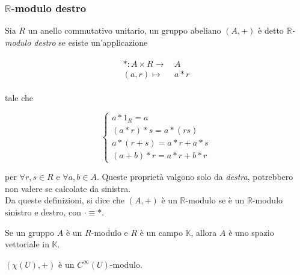 \subsubsection{$ \mathbb{R} $-modulo destro}

Sia $ R $ un anello commutativo unitario, un gruppo abeliano $ (A,+) $ è detto $ \mathbb{R} $\textit{-modulo destro} se esiste un'applicazione

\begin{align}
	\begin{split}
		* : A \times R \to& \, A\\
		(a,r) \mapsto& \, a * r
	\end{split}
\end{align}

tale che

\begin{equation}
	\begin{cases}
		a * 1_{R} = a\\
		(a*r)*s = a*(r s)\\
		a*(r+s) = a*r + a*s\\
		(a+b)*r = a*r + b*r
	\end{cases}
\end{equation}

per $ \forall r,s \in R $ e $ \forall a,b \in A $. Queste proprietà valgono solo da \textit{destra}, potrebbero non valere se calcolate da sinistra.\\
Da queste definizioni, si dice che $ (A,+) $ è un $ \mathbb{R} $-modulo se è un $ \mathbb{R} $-modulo sinistro e destro, con $ \cdot \equiv * $.

\begin{remark}
	Se un gruppo $ A $ è un $ R $-modulo e $ R $ è un campo $ \mathbb{K} $, allora $ A $ è uno spazio vettoriale in $ \mathbb{K} $.
\end{remark}

\begin{theorem}\label{chi-mod}
	$ (\chi(U),+) $ è un $ C^{\infty}(U) $-modulo.
\end{theorem}

